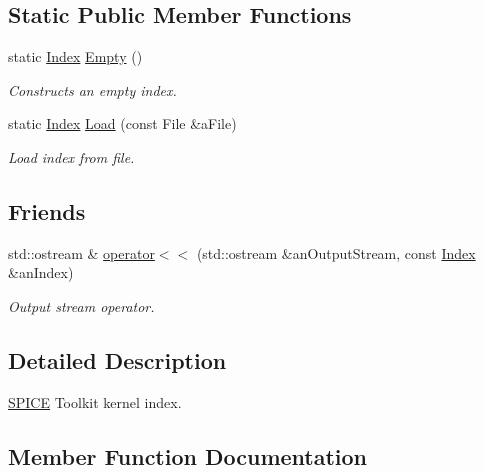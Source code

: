 \subsection*{Static Public Member Functions}
\begin{DoxyCompactItemize}
\item 
static \hyperlink{classlibrary_1_1physics_1_1env_1_1ephem_1_1spice_1_1_index}{Index} \hyperlink{classlibrary_1_1physics_1_1env_1_1ephem_1_1spice_1_1_index_a86b66f9884b8820ab592553005f18c51}{Empty} ()
\begin{DoxyCompactList}\small\item\em Constructs an empty index. \end{DoxyCompactList}\item 
static \hyperlink{classlibrary_1_1physics_1_1env_1_1ephem_1_1spice_1_1_index}{Index} \hyperlink{classlibrary_1_1physics_1_1env_1_1ephem_1_1spice_1_1_index_af7a290a388b985c9dc621512085e400a}{Load} (const File \&a\+File)
\begin{DoxyCompactList}\small\item\em Load index from file. \end{DoxyCompactList}\end{DoxyCompactItemize}
\subsection*{Friends}
\begin{DoxyCompactItemize}
\item 
std\+::ostream \& \hyperlink{classlibrary_1_1physics_1_1env_1_1ephem_1_1spice_1_1_index_a1cdcc2b37f330da2f47a459f6225e98d}{operator$<$$<$} (std\+::ostream \&an\+Output\+Stream, const \hyperlink{classlibrary_1_1physics_1_1env_1_1ephem_1_1spice_1_1_index}{Index} \&an\+Index)
\begin{DoxyCompactList}\small\item\em Output stream operator. \end{DoxyCompactList}\end{DoxyCompactItemize}


\subsection{Detailed Description}
\hyperlink{classlibrary_1_1physics_1_1env_1_1ephem_1_1_s_p_i_c_e}{S\+P\+I\+CE} Toolkit kernel index. 

\subsection{Member Function Documentation}
\mbox{\label{classlibrary_1_1physics_1_1env_1_1ephem_1_1spice_1_1_index_a86b66f9884b8820ab592553005f18c51}} 
